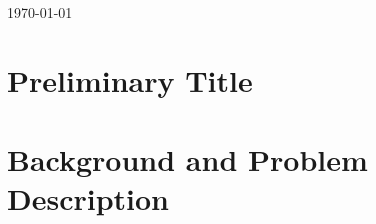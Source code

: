 \documentclass[12pt]{article} %
\begin{document}
\begin{titlepage}
\begin{figure}[!h]
      \label{fig:Triangulation}
\end{figure}

\begin{minipage}{0.4\textwidth}
\end{minipage}\\[1cm]
{\large \today}\\[3cm] %


\vfill %

\end{titlepage}



\newpage %


\section{Preliminary Title} %





\section{Background and Problem Description} %






\end{document}
